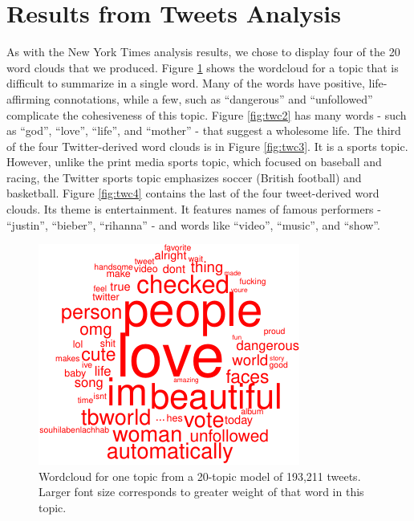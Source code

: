 \documentclass[12pt,]{article}
\begin{document}
\section{Results from Tweets
Analysis}\label{results-from-tweets-analysis}

As with the New York Times analysis results, we chose to display four of
the 20 word clouds that we produced. Figure \ref{fig:twc1} shows the
wordcloud for a topic that is difficult to summarize in a single word.
Many of the words have positive, life-affirming connotations, while a
few, such as ``dangerous'' and ``unfollowed'' complicate the
cohesiveness of this topic. Figure \ref{fig:twc2} has many words - such
as ``god'', ``love'', ``life'', and ``mother'' - that suggest a
wholesome life. The third of the four Twitter-derived word clouds is in
Figure \ref{fig:twc3}. It is a sports topic. However, unlike the print
media sports topic, which focused on baseball and racing, the Twitter
sports topic emphasizes soccer (British football) and basketball. Figure
\ref{fig:twc4} contains the last of the four tweet-derived word clouds.
Its theme is entertainment. It features names of famous performers -
``justin'', ``bieber'', ``rihanna'' - and words like ``video'',
``music'', and ``show''.

\begin{figure}
\includegraphics[width=\textwidth]{lda-tutorial-2016_files/figure-latex/tw-wordcloud1-5.pdf}
\caption{Wordcloud for one topic from a 20-topic model of 193,211 tweets. Larger font size corresponds to greater weight of that word in this topic.\label{fig:twc1}}
\end{figure}
\end{document}
